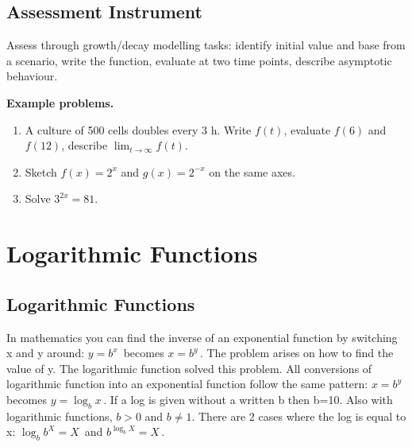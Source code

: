 \subsection{Assessment Instrument}
\label{ssec:asse-3669}


Assess through growth/decay modelling tasks: identify initial value and
base from a scenario, write the function, evaluate at two time points,
describe asymptotic behaviour.

\textbf{Example problems.}
\begin{enumerate}
    \item A culture of 500 cells doubles every 3 h. Write $f(t)$,
          evaluate $f(6)$ and $f(12)$, describe $\lim_{t\to\infty}f(t)$.
    \item Sketch $f(x)=2^x$ and $g(x)=2^{-x}$ on the same axes.
    \item Solve $3^{2x}=81$.
\end{enumerate}



\section{Logarithmic Functions}
\label{sec:loga-7d37}



\subsection{Logarithmic Functions}
\label{sss:loga-7d37}







In mathematics you can find the inverse of an exponential function by switching x and y
around: $y = b^x\,$ becomes $x = b^y\,$. The problem arises on how to find the value of y.
The logarithmic function solved this problem. All conversions of logarithmic function into
an exponential function follow the same pattern: $x = b^y\,$ becomes $y = \log _b x\,$. If
a log is given without a written b then b=10. Also with logarithmic functions, $b > 0$ and
$b \ne 1$. There are 2 cases where the log is equal to x: $\log _bb^X = X\,$ and $b^{\log
_bX} = X\,$.



